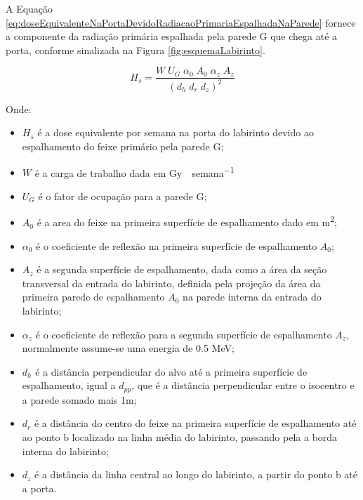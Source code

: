 \documentclass[11pt,a4paper]{article}
\begin{document}
            A Equação \ref{eq:doseEquivalenteNaPortaDevidoRadiacaoPrimariaEspalhadaNaParede} fornece a componente da radiação primária espalhada pela parede G que chega até a porta, conforme sinalizada na Figura \ref{fig:esquemaLabirinto}.

            \begin{equation}
                H_s = \frac{W \; U_G \; \alpha_0 \; A_0 \; \alpha_z \; A_z}{\left(d_h \; d_r \; d_z\right) ^ 2}
                \label{eq:doseEquivalenteNaPortaDevidoRadiacaoPrimariaEspalhadaNaParede}
            \end{equation}

            Onde:

                \begin{itemize}
                    \item $H_s$ é a dose equivalente por semana na porta do labirinto devido ao espalhamento do feixe primário pela parede G;
                    \item $W$ é a carga de trabalho dada em \unit{Gy \cdot semana^{-1}}
                    \item $U_G$ é o fator de ocupação para a parede G;
                    \item $A_0$ é a area do feixe na primeira superfície de espalhamento dado em \unit{m^2};
                    \item $\alpha_0$ é o coeficiente de reflexão na primeira superfície de espalhamento $A_0$;
                    \item $A_z$ é a segunda superfície de espalhamento, dada como a área da seção transversal da entrada do labirinto, definida pela projeção da área da primeira parede de espalhamento $A_0$ na parede interna da entrada do labirinto;
                    \item $\alpha_z$ é o coeficiente de reflexão para a segunda superfície de espalhamento $A_z$, normalmente assume-se uma energia de 0.5 MeV;
                    \item $d_h$ é a distância perpendicular do alvo até a primeira superfície de espalhamento, igual a $d_{pp}$, que é a distância perpendicular entre o isocentro e a parede somado mais 1m;
                    \item $d_r$ é a distância do centro do feixe na primeira superfície de espalhamento até ao ponto b localizado na linha média do labirinto, passando pela a borda interna do labirinto;
                    \item $d_z$ é a distância da linha central ao longo do labirinto, a partir do ponto b até a porta.
                \end{itemize}
            
\end{document}
